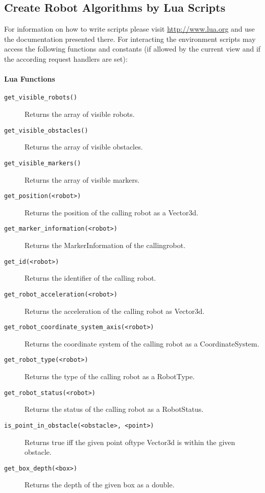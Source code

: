 \subsection{Create Robot Algorithms by Lua Scripts}
For information on how to write \Lua scripts please visit \url{http://www.lua.org} and use the documentation presented there. For interacting the environment \Lua scripts may access the following functions and constants (if allowed by the current view and if the according request handlers are set):

\paragraph{Lua Functions}

\begin{description}
	\item [\texttt{get\_visible\_robots()}] Returns the array of visible robots.
	\item [\texttt{get\_visible\_obstacles()}] Returns the array of visible obstacles.
	\item [\texttt{get\_visible\_markers()}] Returns the array of visible markers.
	\item [\texttt{get\_position(<robot>)}] Returns the position of the calling robot as a Vector3d.
	\item [\texttt{get\_marker\_information(<robot>)}] Returns the MarkerInformation of the calling\linebreak robot.
	\item [\texttt{get\_id(<robot>)}] Returns the identifier of the calling robot.
	\item [\texttt{get\_robot\_acceleration(<robot>)}] Returns the acceleration of the calling robot as Vector3d.
	\item [\texttt{get\_robot\_coordinate\_system\_axis(<robot>)}] Returns the coordinate system of the calling robot as a CoordinateSystem.
	\item [\texttt{get\_robot\_type(<robot>)}] Returns the type of the calling robot as a RobotType.
	\item [\texttt{get\_robot\_status(<robot>)}] Returns the status of the calling robot as a RobotStatus.
	\item [\texttt{is\_point\_in\_obstacle(<obstacle>, <point>)}] Returns true iff the given point of\linebreak type Vector3d is within the given obstacle.
	\item [\texttt{get\_box\_depth(<box>)}] Returns the depth of the given box as a double.

\end{description}
